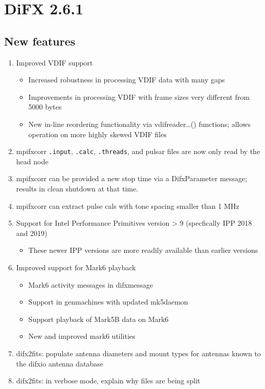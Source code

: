 \section{DiFX 2.6.1}

\subsection{New features}

\begin{enumerate}
\item Improved VDIF support
\begin{itemize}
  \item Increased robustness in processing VDIF data with many gaps
  \item Improvements in processing VDIF with frame sizes very different from 5000 bytes
  \item  New in-line reordering functionality via vdifreader…() functions; allows operation on more highly skewed VDIF files
\end{itemize}
\item mpifxcorr {\tt .input}, {\tt .calc}, {\tt .threads}, and pulsar files are now only read by the head node
\item mpifxcorr can be provided a new stop time via a DifxParameter message; results in clean shutdown at that time.
\item mpifxcorr can extract pulse cals with tone spacing smaller than 1 MHz
\item Support for Intel Performance Primitives version > 9 (specfically IPP 2018 and 2019)
\begin{itemize}
  \item These newer IPP versions are more readily available than earlier versions
\end{itemize}
\item Improved support for Mark6 playback
\begin{itemize}
  \item Mark6 activity messages in difxmessage
  \item Support in genmachines with updated mk5daemon
  \item Support playback of Mark5B data on Mark6
  \item New and improved mark6 utilities
\end{itemize}
\item difx2fits: populate antenna diameters and mount types for antennas known to the difxio antenna database
\item difx2fits: in verbose mode, explain why files are being split

\end{enumerate}
